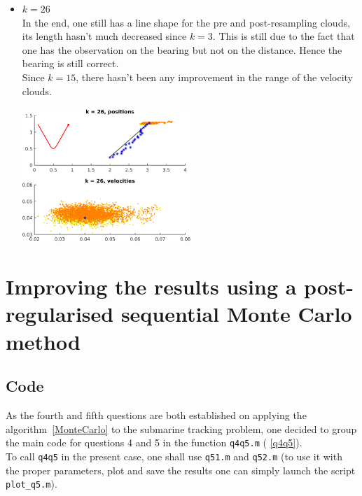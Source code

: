 \documentclass[english,DIV=13]{scrreprt}
\begin{document}
\begin{itemize}
\begin{center}
\begin{minipage}{.5\textwidth}
	\end{minipage}
\end{center}
\item $k=26$\\
In the end, one still has a line shape for the pre and post-resampling clouds, its length hasn't much decreased
since $k=3$. This is still due to the fact that one has the observation on the bearing but not on the distance.
Hence the bearing is still correct.\\
Since $k=15$, there hasn't been any improvement in the range of the velocity clouds.

  \begin{center}
		 \includegraphics[width=0.5\textwidth]{img/q4_26.png}
\end{center}
  

\end{itemize} 

\chapter{Improving the results using a post-regularised sequential Monte Carlo method}
\section*{Code}
As the fourth and fifth questions are both established on applying the algorithm~\ref{MonteCarlo}
to the submarine tracking problem, one decided to group the main code for questions 4 and 5
in the function \texttt{q4q5.m} ( \ref{q4q5}).\\
To call \texttt{q4q5} in the present case, one shall use \texttt{q51.m} and \texttt{q52.m} 
(to use it with the proper parameters, plot and save the results one can simply launch the script \texttt{plot\_q5.m}).\\


\end{document}
